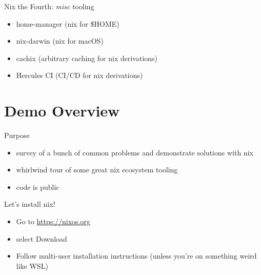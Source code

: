 \documentclass[bigger]{beamer}
\begin{document}
\begin{frame}[label={sec:org3a6a84f}]{Nix the Fourth: \emph{misc} tooling}
\begin{itemize}
\item home-manager (nix for \$HOME)
\item nix-darwin (nix for macOS)
\item cachix (arbitrary caching for nix derivations)
\item Hercules CI (CI/CD for nix derivations)
\end{itemize}
\end{frame}
\section{Demo Overview}
\label{sec:org3aedbf8}
\begin{frame}[label={sec:org834285b}]{Purpose}
\begin{itemize}
\item survey of a bunch of common problems and demonstrate solutions with nix
\item whirlwind tour of some great nix ecosystem tooling
\item code is public
\end{itemize}
\end{frame}
\begin{frame}[label={sec:orgb12a4c2}]{Let's install nix!}
\begin{itemize}
\item Go to \url{https://nixos.org}
\item select \alert{Download}
\item Follow multi-user installation instructions (unless you're on something weird like WSL)
\end{itemize}
\end{frame}
\end{document}
